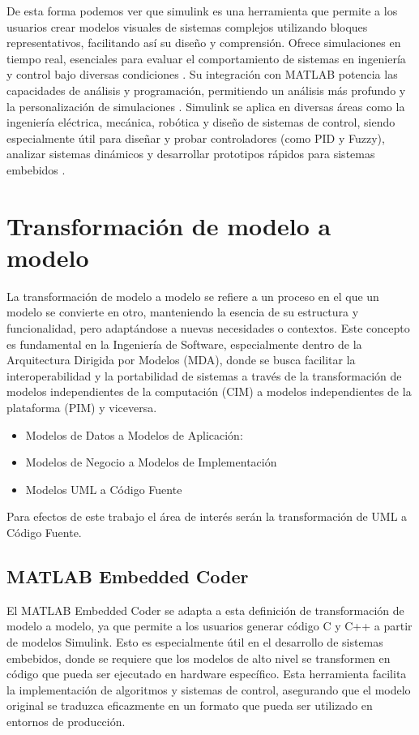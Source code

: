 De esta forma podemos ver que simulink es una herramienta que permite a los usuarios crear modelos visuales de sistemas complejos utilizando bloques representativos, facilitando así su diseño y comprensión. Ofrece simulaciones en tiempo real, esenciales para evaluar el comportamiento de sistemas en ingeniería y control bajo diversas condiciones \cite{PealozaLuna2022SimulacinDU}. Su integración con MATLAB potencia las capacidades de análisis y programación, permitiendo un análisis más profundo y la personalización de simulaciones \cite{Daza2021PlataformaDP}. Simulink se aplica en diversas áreas como la ingeniería eléctrica, mecánica, robótica y diseño de sistemas de control, siendo especialmente útil para diseñar y probar controladores (como PID y Fuzzy), analizar sistemas dinámicos y desarrollar prototipos rápidos para sistemas embebidos \cite*{CardozoSarmiento2019SimulationOI}.

\section{Transformación de modelo a modelo}\label{sec:modelo2model}

La transformación de modelo a modelo se refiere a un proceso en el que un modelo se convierte en otro, manteniendo la esencia de su estructura y funcionalidad, 
pero adaptándose a nuevas necesidades o contextos. Este concepto es fundamental en la Ingeniería de Software, especialmente dentro de la Arquitectura Dirigida 
por Modelos (MDA), donde se busca facilitar la interoperabilidad y la portabilidad de sistemas a través de la transformación de modelos independientes de la computación 
(CIM) a modelos independientes de la plataforma (PIM) y viceversa.

\begin{itemize}
    \item Modelos de Datos a Modelos de Aplicación:
    \item Modelos de Negocio a Modelos de Implementación
    \item Modelos UML a Código Fuente
\end{itemize}

Para efectos de este trabajo el área de interés serán la transformación de UML a Código Fuente.

\subsection{MATLAB Embedded Coder}

El MATLAB Embedded Coder se adapta a esta definición de transformación de modelo a modelo, ya que permite a los usuarios generar código C y C++ a partir de modelos 
Simulink. Esto es especialmente útil en el desarrollo de sistemas embebidos, donde se requiere que los modelos de alto nivel se transformen en código 
que pueda ser ejecutado en hardware específico. Esta herramienta facilita la implementación de algoritmos y sistemas de control, asegurando que el modelo original 
se traduzca eficazmente en un formato que pueda ser utilizado en entornos de producción.

